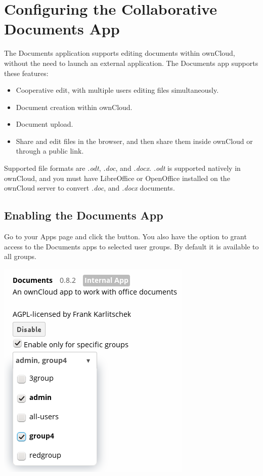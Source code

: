 \documentclass[letterpaper,10pt,english]{sphinxmanual}
\begin{document}
\section{Configuring the Collaborative Documents App}
\label{configuration_files/collaborative_documents_configuration::doc}\label{configuration_files/collaborative_documents_configuration:configuring-the-collaborative-documents-app}
The Documents application supports editing documents within ownCloud, without the
need to launch an external application. The Documents app supports these
features:
\begin{itemize}
\item {} 
Cooperative edit, with multiple users editing files simultaneously.

\item {} 
Document creation within ownCloud.

\item {} 
Document upload.

\item {} 
Share and edit files in the browser, and then share them inside ownCloud or
through a public link.

\end{itemize}

Supported file formats are \emph{.odt}, \emph{.doc}, and \emph{.docx}. \emph{.odt} is supported
natively in ownCloud, and you must have LibreOffice or OpenOffice installed on
the ownCloud server to convert \emph{.doc}, and \emph{.docx} documents.


\subsection{Enabling the Documents App}
\label{configuration_files/collaborative_documents_configuration:enabling-the-documents-app}
Go to your Apps page and click the  button. You also have the option
to grant access to the Documents apps to selected user groups. By default it is
available to all groups.

\includegraphics{documents_app_enable.png}
\end{document}
